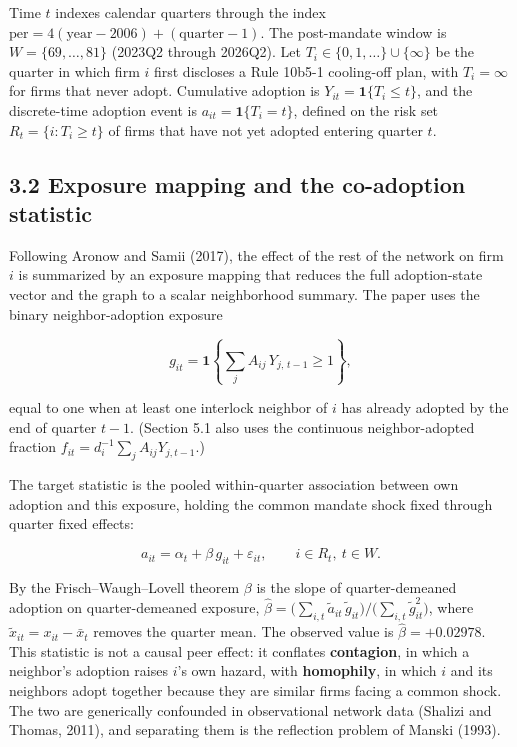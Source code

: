 \documentclass[
  a4paper,
]{article}
\begin{document}
Time \(t\) indexes calendar quarters through the index
\(\text{per} = 4(\text{year} - 2006) + (\text{quarter} - 1)\). The
post-mandate window is \(W = \{69, \dots, 81\}\) (2023Q2 through
2026Q2). Let \(T_i \in \{0, 1, \dots\} \cup \{\infty\}\) be the quarter
in which firm \(i\) first discloses a Rule 10b5-1 cooling-off plan, with
\(T_i = \infty\) for firms that never adopt. Cumulative adoption is
\(Y_{it} = \mathbf{1}\{T_i \le t\}\), and the discrete-time adoption
event is \(a_{it} = \mathbf{1}\{T_i = t\}\), defined on the risk set
\(R_t = \{i : T_i \ge t\}\) of firms that have not yet adopted entering
quarter \(t\).

\subsection{3.2 Exposure mapping and the co-adoption
statistic}\label{exposure-mapping-and-the-co-adoption-statistic}

Following Aronow and Samii (2017), the effect of the rest of the network
on firm \(i\) is summarized by an exposure mapping that reduces the full
adoption-state vector and the graph to a scalar neighborhood summary.
The paper uses the binary neighbor-adoption exposure

\[ g_{it} = \mathbf{1}\!\left\{ \sum_{j} A_{ij}\, Y_{j,\,t-1} \ge 1 \right\}, \]

equal to one when at least one interlock neighbor of \(i\) has already
adopted by the end of quarter \(t-1\). (Section 5.1 also uses the
continuous neighbor-adopted fraction
\(f_{it} = d_i^{-1} \sum_j A_{ij} Y_{j,t-1}\).)

The target statistic is the pooled within-quarter association between
own adoption and this exposure, holding the common mandate shock fixed
through quarter fixed effects:

\[ a_{it} = \alpha_t + \beta\, g_{it} + \varepsilon_{it}, \qquad i \in R_t,\ t \in W. \]

By the Frisch--Waugh--Lovell theorem \(\beta\) is the slope of
quarter-demeaned adoption on quarter-demeaned exposure,
\(\hat\beta = \big(\sum_{i,t} \tilde a_{it}\,\tilde g_{it}\big) / \big(\sum_{i,t} \tilde g_{it}^{2}\big)\),
where \(\tilde{x}_{it} = x_{it} - \bar{x}_{t}\) removes the quarter
mean. The observed value is \(\hat\beta = +0.02978\). This statistic is
not a causal peer effect: it conflates \textbf{contagion}, in which a
neighbor's adoption raises \(i\)'s own hazard, with \textbf{homophily},
in which \(i\) and its neighbors adopt together because they are similar
firms facing a common shock. The two are generically confounded in
observational network data (Shalizi and Thomas, 2011), and separating
them is the reflection problem of Manski (1993).
\end{document}
